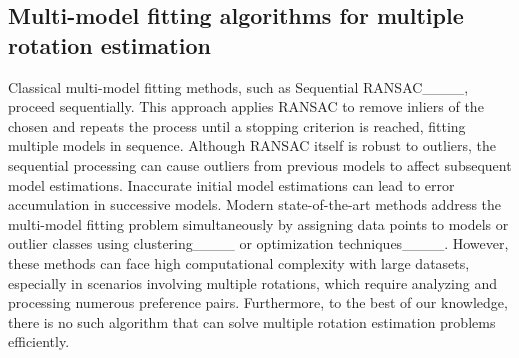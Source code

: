 \subsection{Multi-model fitting algorithms for multiple rotation estimation}
Classical multi-model fitting methods, such as Sequential RANSAC____, proceed sequentially. This approach applies RANSAC to remove inliers of the chosen and repeats the process until a stopping criterion is reached, fitting multiple models in sequence. Although RANSAC itself is robust to outliers, the sequential processing can cause outliers from previous models to affect subsequent model estimations. Inaccurate initial model estimations can lead to error accumulation in successive models. Modern state-of-the-art methods address the multi-model fitting problem simultaneously by assigning data points to models or outlier classes using clustering____ or optimization techniques____. However, these methods can face high computational complexity with large datasets, especially in scenarios involving multiple rotations, which require analyzing and processing numerous preference pairs. Furthermore, to the best of our knowledge, there is no such algorithm that can solve multiple rotation estimation problems efficiently. 
